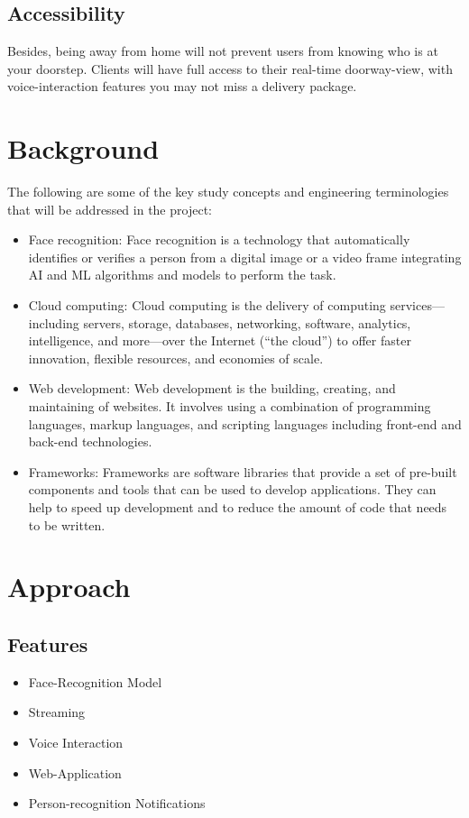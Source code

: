 \documentclass[a4 paper, 12pt]{article}
\begin{document}
\subsection{Accessibility}
Besides, being away from home will not prevent users from knowing who is at your doorstep. Clients will have full access to their real-time doorway-view, with voice-interaction features you may not miss a delivery package.
\section{Background}
The following are some of the key study concepts and engineering terminologies that will be addressed in the project:

\begin{itemize}
    \item Face recognition: Face recognition is a technology that automatically identifies or verifies a person from a digital image or a video frame integrating AI and ML algorithms and models to perform the task.
    \item Cloud computing: Cloud computing is the delivery of computing services—including servers, storage, databases, networking, software, analytics, intelligence, and more—over the Internet (“the cloud”) to offer faster innovation, flexible resources, and economies of scale.
    \item Web development: Web development is the building, creating, and maintaining of websites. It involves using a combination of programming languages, markup languages, and scripting languages including front-end and back-end technologies.
    \item Frameworks: Frameworks are software libraries that provide a set of pre-built components and tools that can be used to develop applications. They can help to speed up development and to reduce the amount of code that needs to be written.
\end{itemize}

\section{Approach}
\subsection{Features}
\begin{itemize}
    \item Face-Recognition Model
    \item Streaming
    \item Voice Interaction
    \item Web-Application
    \item Person-recognition Notifications
\end{itemize}
\end{document}
